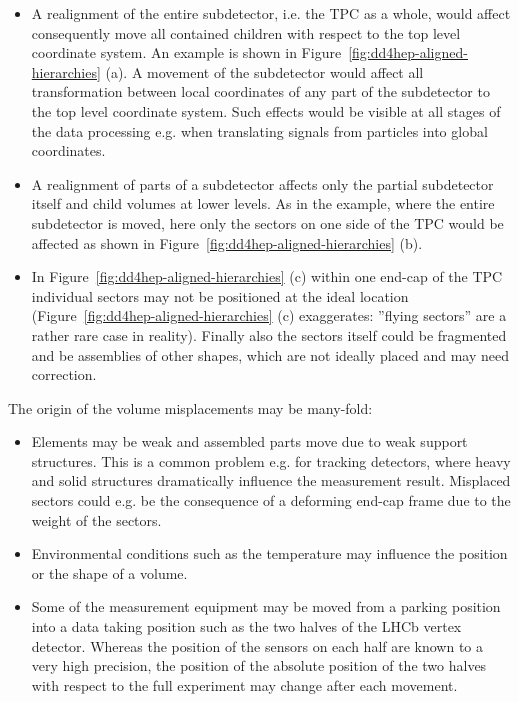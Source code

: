 \documentclass[10pt,a4paper]{article}
\begin{document}
\noindent
\begin{itemize}\itemcompact
\item A realignment of the entire subdetector, i.e. the TPC as a whole, 
    would affect consequently move all contained children with respect to the 
    top level coordinate system. An example is shown in 
    Figure~\ref{fig:dd4hep-aligned-hierarchies} (a). A movement of the subdetector
    would affect all transformation between local coordinates of any part of the
    subdetector to the top level coordinate system. Such effects would be visible 
    at all stages of the data processing e.g. when translating signals from 
    particles into global coordinates.
\item A realignment of parts of a subdetector affects only the partial subdetector
    itself and child volumes at lower levels. As in the example, where the entire
    subdetector is moved, here only the sectors on one side of the TPC would be affected
    as shown in Figure~\ref{fig:dd4hep-aligned-hierarchies} (b).
\item In Figure~\ref{fig:dd4hep-aligned-hierarchies} (c) within one end-cap of the TPC
    individual sectors may not be positioned at the ideal location
    (Figure~\ref{fig:dd4hep-aligned-hierarchies} (c) exaggerates: 
    ''flying sectors'' are a rather rare case in reality).
    Finally also the sectors itself could be fragmented and be assemblies of other
    shapes, which are not ideally placed and may need correction.
\end{itemize}
The origin of the volume misplacements may be many-fold:
\begin{itemize}\itemcompact
\item Elements may be weak and assembled parts move due to weak support structures.
    This is a common problem e.g. for tracking detectors, where heavy and solid 
    structures dramatically influence the measurement result.
    Misplaced sectors could e.g. be the consequence of a deforming end-cap frame due 
    to the weight of the sectors.
\item Environmental conditions such as the temperature may influence the 
    position or the shape of a volume.
\item Some of the measurement equipment may be moved from a parking position into 
    a data taking position such as the two halves of the LHCb vertex detector. 
    Whereas the position of the sensors on each half are known to a very high 
    precision, the position of the absolute position of the two halves with respect
    to the full experiment may change after each movement.
\end{itemize}
\end{document}
